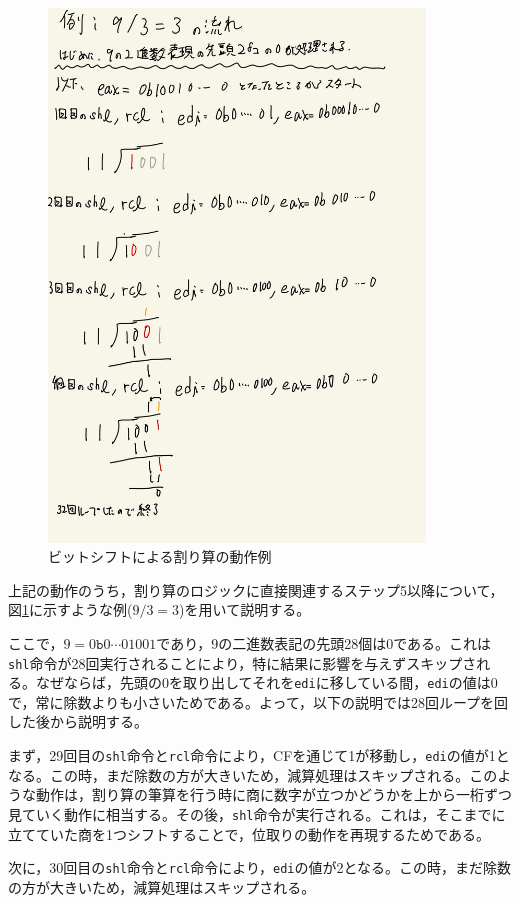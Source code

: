 \documentclass[a4paper]{jsarticle}
\newcommand{\var}[1]{\texttt{#1}}
\begin{document}
\begin{figure}[h]
    \centering
    \includegraphics[width=10cm]{./img-div.jpg}
    \caption{ビットシフトによる割り算の動作例}
    \label{fig:div_example}
\end{figure}


上記の動作のうち，割り算のロジックに直接関連するステップ5以降について，図\ref{fig:div_example}に示すような例($9 / 3 = 3$)を用いて説明する。

ここで，$9 = 0\var{b}0\cdots01001$であり，9の二進数表記の先頭28個は0である。これは\var{shl}命令が28回実行されることにより，特に結果に影響を与えずスキップされる。なぜならば，先頭の0を取り出してそれを\var{edi}に移している間，\var{edi}の値は0で，常に除数よりも小さいためである。よって，以下の説明では28回ループを回した後から説明する。

まず，29回目の\var{shl}命令と\var{rcl}命令により，CFを通じて1が移動し，\var{edi}の値が1となる。この時，まだ除数の方が大きいため，減算処理はスキップされる。このような動作は，割り算の筆算を行う時に商に数字が立つかどうかを上から一桁ずつ見ていく動作に相当する。その後，\var{shl}命令が実行される。これは，そこまでに立てていた商を1つシフトすることで，位取りの動作を再現するためである。

次に，30回目の\var{shl}命令と\var{rcl}命令により，\var{edi}の値が2となる。この時，まだ除数の方が大きいため，減算処理はスキップされる。
\end{document}
